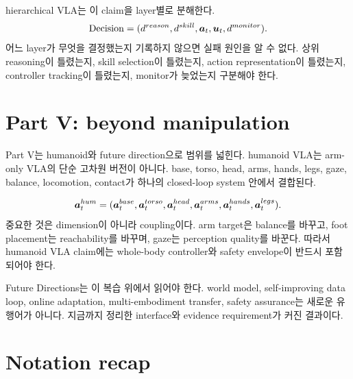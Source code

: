 hierarchical VLA는 이 claim을 layer별로 분해한다.
\begin{equation}
  \mathrm{Decision}
  =
  (
  d^{reason},
  d^{skill},
  \bm{a}_t,
  \bm{u}_t,
  d^{monitor}
  ).
  \label{eq:ch21-hierarchy-decision}
\end{equation}
어느 layer가 무엇을 결정했는지 기록하지 않으면 실패 원인을 알 수 없다. 상위 reasoning이 틀렸는지, skill selection이 틀렸는지, action representation이 틀렸는지, controller tracking이 틀렸는지, monitor가 늦었는지 구분해야 한다.

\section{Part V: beyond manipulation}

Part V는 humanoid와 future direction으로 범위를 넓힌다. humanoid VLA는 arm-only VLA의 단순 고차원 버전이 아니다. base, torso, head, arms, hands, legs, gaze, balance, locomotion, contact가 하나의 closed-loop system 안에서 결합된다.

\begin{equation}
  \bm{a}_t^{hum}
  =
  (
  \bm{a}_t^{base},
  \bm{a}_t^{torso},
  \bm{a}_t^{head},
  \bm{a}_t^{arms},
  \bm{a}_t^{hands},
  \bm{a}_t^{legs}
  ).
  \label{eq:ch21-humanoid-review}
\end{equation}
중요한 것은 dimension이 아니라 coupling이다. arm target은 balance를 바꾸고, foot placement는 reachability를 바꾸며, gaze는 perception quality를 바꾼다. 따라서 humanoid VLA claim에는 whole-body controller와 safety envelope이 반드시 포함되어야 한다.

Future Directions는 이 복습 위에서 읽어야 한다. world model, self-improving data loop, online adaptation, multi-embodiment transfer, safety assurance는 새로운 유행어가 아니다. 지금까지 정리한 interface와 evidence requirement가 커진 결과이다.

\section{Notation recap}

